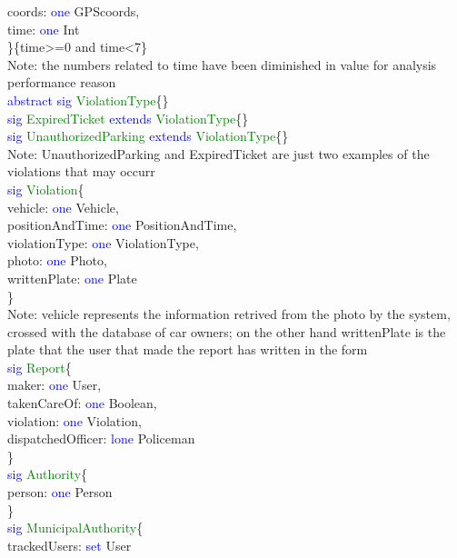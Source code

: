 coords: \textcolor{blue}{one} GPScoords,\\
time: \textcolor{blue}{one} Int\\ 
\}\{time>=0 and time<7\} \\
Note: the numbers related to time have been diminished in value for analysis performance reason\\
\textcolor{blue}{abstract sig}
\textcolor{green}{ViolationType}\{\} \\
\textcolor{blue}{sig}
\textcolor{green}{ExpiredTicket}
\textcolor{blue}{extends}
\textcolor{green}{ViolationType}\{\} \\
\textcolor{blue}{sig}
\textcolor{green}{UnauthorizedParking}
\textcolor{blue}{extends}
\textcolor{green}{ViolationType}\{\} \\
Note: UnauthorizedParking and ExpiredTicket are just two examples of the violations that may occurr\\
\textcolor{blue}{sig}
\textcolor{green}{Violation}\{ \\
vehicle: \textcolor{blue}{one} Vehicle,\\ 
positionAndTime: \textcolor{blue}{one} PositionAndTime,\\
violationType: \textcolor{blue}{one} ViolationType,\\
photo: \textcolor{blue}{one} Photo,\\
writtenPlate: \textcolor{blue}{one} Plate\\
\}\ \\
Note: vehicle represents the information retrived from the photo by the system, crossed with the database of car owners; on the other hand writtenPlate is the plate that the user that made the report has written in the form\\
\textcolor{blue}{sig}
\textcolor{green}{Report}\{\\
maker: \textcolor{blue}{one} User,\\
takenCareOf: \textcolor{blue}{one} Boolean,\\
violation: \textcolor{blue}{one} Violation,\\
dispatchedOfficer: \textcolor{blue}{lone} Policeman\\
\}\\
\textcolor{blue}{sig}
\textcolor{green}{Authority}\{\\
person: \textcolor{blue}{one} Person\\
\} \\
\textcolor{blue}{sig}
\textcolor{green}{MunicipalAuthority}\{\\
trackedUsers: \textcolor{blue}{set} User\\
